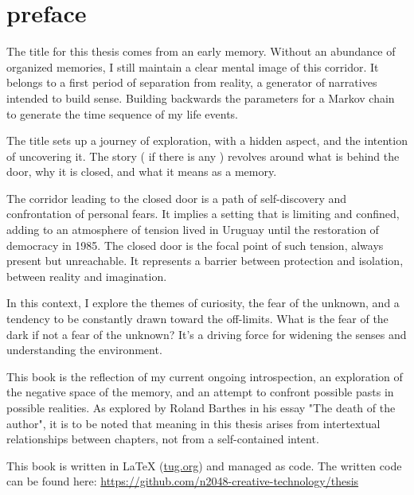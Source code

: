 \chapter*{preface}
\normalsize

The title for this thesis comes from an early memory. Without an abundance of organized memories, I still maintain a clear mental image of this corridor. It belongs to a first period of separation from reality, a generator of narratives intended to build sense. Building backwards the parameters for a Markov chain to generate the time sequence of my life events.    

The title sets up a journey of exploration, with a hidden aspect, and the intention of uncovering it. The story ( if there is any ) {r}evolves around what is behind the door, why it is closed, and what it means as a memory.

The corridor leading to the closed door is a path of self-discovery and confrontation of personal fears. It implies a setting that is limiting and confined, adding to an atmosphere of tension lived in Uruguay until the restoration of democracy in 1985. The closed door is the focal point of such tension, always present but unreachable. It represents a barrier between protection and isolation, between reality and imagination.

In this context, I explore the themes of curiosity, the fear of the unknown, and a tendency to be constantly drawn toward the off-limits. What is the fear of the dark if not a fear of the unknown? It’s a driving force for widening the senses and understanding the environment.

This book is the reflection of my current ongoing introspection, an exploration of the negative space of the memory, and an attempt to confront possible pasts in possible realities. As explored by Roland Barthes in his essay "The death of the author"\citep{barthes1967}, it is to be noted that meaning in this thesis arises from intertextual relationships between chapters, not from a self-contained intent.

This book is written in \LaTeX{} (\href{https://www.tug.org/texlive/quickinstall.html}{tug.org}) and managed as code. The written code can be found here: \href{https://github.com/n2048-creative-technology/thesis}{https://github.com/n2048-creative-technology/thesis} 

